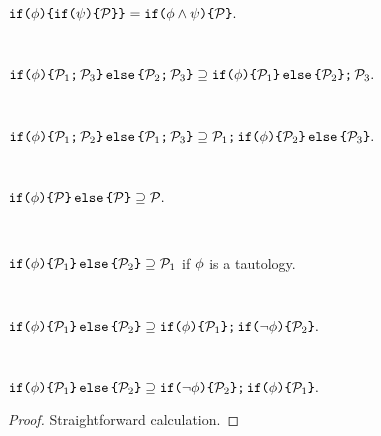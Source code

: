 \begin{lemma}
  \label{lem:if}

  \begin{enumerate*}[label=(\alph*),ref=\alph*]
    \setcounter{enumi}{3}
    \item \label{lem:if:if}
    \begin{math}
      \xIFTHEN{\aForm}{
        \xIFTHEN{\bForm}{\aPSS}{}
      }{}
      =
      \xIFTHEN{\aForm\land\bForm}{\aPSS}{}.
    \end{math}

  \\\item \label{lem:if:seq}
    \begin{math}
      \xIFTHEN{\aForm}{
        \xSEMI{\aPSS_1}{\aPSS_3}
      }{
        \xSEMI{\aPSS_2}{\aPSS_3}
      }
      \supseteq
      \xSEMI{
        \xIFTHEN{\aForm}{\aPSS_1}{\aPSS_2}
      }{
        \aPSS_3
      }.
    \end{math}

  \\\item \label{lem:seq:if}
    \begin{math}
      \xIFTHEN{\aForm}{
        \xSEMI{\aPSS_1}{\aPSS_2}
      }{
        \xSEMI{\aPSS_1}{\aPSS_3}
      }
      \supseteq
      \xSEMI{
        \aPSS_1
      }{
        \xIFTHEN{\aForm}{\aPSS_2}{\aPSS_3}
      }.
    \end{math}

  \\\item \label{lem:if:elim}
    \begin{math}
      \xIFTHEN{\aForm}{\aPSS}{\aPSS}
      \supseteq
      \aPSS.
    \end{math}

  \\\item \label{lem:if:dead}
    \begin{math}
      \xIFTHEN{\aForm}{\aPSS_1}{\aPSS_2}
      \supseteq
      \aPSS_1
    \end{math}
    if $\phi$ is a tautology.

  \\\item
    \begin{math} \label{lem:ifelse:if:if1}
      \xIFTHEN{\aForm}{\aPSS_1}{\aPSS_2}
      \supseteq
      \xSEMI{
        \xIFTHEN{\aForm}{\aPSS_1}{}
      }{
        \xIFTHEN{\lnot\aForm}{\aPSS_2}{}
      }.
    \end{math}
    
  \\\item
    \begin{math} \label{lem:ifelse:if:if2}
      \xIFTHEN{\aForm}{\aPSS_1}{\aPSS_2}
      \supseteq
      \xSEMI{
        \xIFTHEN{\lnot\aForm}{\aPSS_2}{}
      }{
        \xIFTHEN{\aForm}{\aPSS_1}{}
      }.
    \end{math}
  \end{enumerate*}      
  \vspace{-.5\baselineskip}
  \begin{proof}
    Straightforward calculation.
  \end{proof}
\end{lemma}

